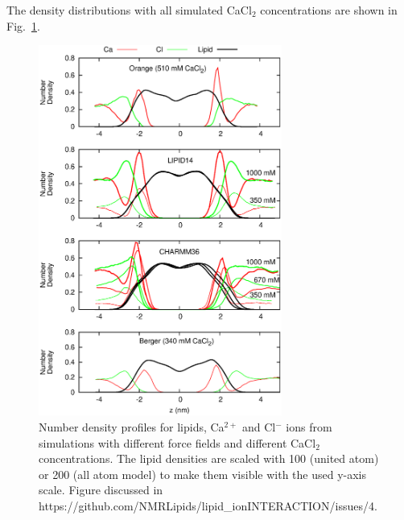 \documentclass[pre,aps,floatfix,authordate1-4,twocolumn]{revtex4-1}
\begin{document}
The density distributions with all simulated CaCl$_2$ concentrations are shown in Fig.~\ref{CAdensities}.
\begin{figure}[]
  \centering
  \includegraphics[width=8cm]{../Fig/CAdensities.eps}
  \caption{\label{CAdensities}
    Number density profiles for lipids, Ca$^{2+}$ and Cl$^-$ ions from simulations with different force fields 
    and different CaCl$_2$ concentrations. 
    The lipid densities are scaled with 100 (united atom) or 200 (all atom model) to make them visible with the used y-axis scale.
    Figure discussed in https://github.com/NMRLipids/lipid\_ionINTERACTION/issues/4.
  }
\end{figure}


\end{document}
